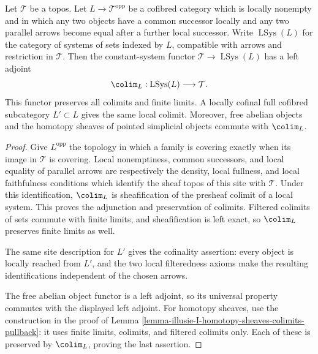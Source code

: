 \begin{lemma}
\label{lemma-illusie-I-local-filtered-colimit}
Let $\mathcal{T}$ be a topos. Let $L \to \mathcal{T}^{\mathrm{opp}}$ be a
cofibred category which is locally nonempty and in which any two objects
have a common successor locally and any two parallel arrows become equal
after a further local successor. Write $\operatorname{LSys}(L)$ for the
category of systems of sets indexed by $L$, compatible with arrows and
restriction in $\mathcal{T}$. Then the constant-system functor
$\mathcal{T} \to \operatorname{LSys}(L)$ has a left adjoint
$$
\colim_L : \operatorname{LSys}(L) \longrightarrow \mathcal{T}.
$$
This functor preserves all colimits and finite limits. A locally cofinal full
cofibred subcategory $L' \subset L$ gives the same local colimit.
Moreover, free abelian objects and the homotopy sheaves of pointed
simplicial objects commute with $\colim_L$.
\end{lemma}

\begin{proof}
Give $L^{\mathrm{opp}}$ the topology in which a family is covering exactly
when its image in $\mathcal{T}$ is covering. Local nonemptiness, common
successors, and local equality of parallel arrows are respectively the
density, local fullness, and local faithfulness conditions which identify
the sheaf topos of this site with $\mathcal{T}$. Under this identification,
$\colim_L$ is sheafification of the presheaf colimit of a local system. This
proves the adjunction and preservation of colimits. Filtered colimits of sets
commute with finite limits, and sheafification is left exact, so $\colim_L$
preserves finite limits as well.

The same site description for $L'$ gives the cofinality assertion: every
object is locally reached from $L'$, and the two local filteredness axioms
make the resulting identifications independent of the chosen arrows.

The free abelian object functor is a left adjoint, so its universal property
commutes with the displayed left adjoint. For homotopy sheaves, use the
construction in the proof of Lemma
\ref{lemma-illusie-I-homotopy-sheaves-colimits-pullback}: it uses finite
limits, colimits, and filtered colimits only. Each of these is preserved by
$\colim_L$, proving the last assertion.
\end{proof}

